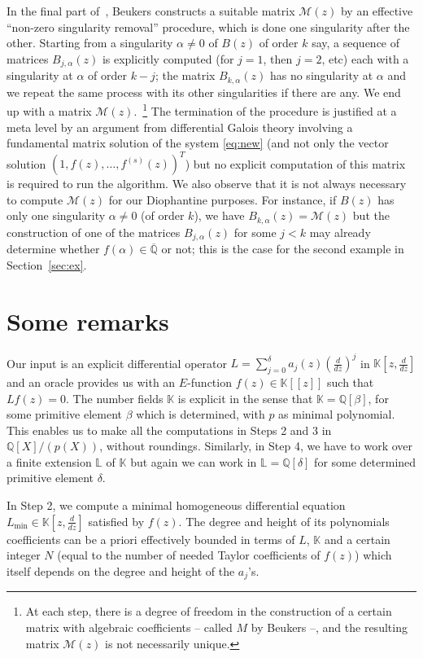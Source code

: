 \documentclass[reqno,english,12pt,a4paper]{smfart}
\numberwithin{equation}{section}
\def\Qbar{\overline{\mathbb Q}}
\def\K{\mathbb K}
\begin{document}
In the final part of~\cite{beukers}, Beukers constructs a suitable matrix $\mathcal{M}(z)$ by an effective ``non-zero singularity removal'' procedure, which is done one singularity after the other. Starting from a singularity $\alpha\neq 0$ of $B(z)$ of order $k$ say, 
a sequence of matrices $B_{j,\alpha}(z)$ is  explicitly computed (for $j=1$, then $j=2$, etc) each with a singularity at $\alpha$ of order $k-j$; the matrix $B_{k,\alpha}(z)$ has no singularity at $\alpha$ and we repeat the same process with its other singularities if there are any. We end up with a matrix $\mathcal{M}(z)$.~\footnote{At each step, there is a degree of freedom in the construction of a certain matrix with algebraic coefficients -- called $M$ by Beukers --, and the resulting matrix $\mathcal{M}(z)$ is not necessarily unique.} The termination of the procedure is justified at a meta level by an argument from differential Galois theory involving a fundamental matrix solution of the system \eqref{eq:new} (and not only the vector solution $(1,f(z), \ldots, f^{(s)}(z))^T$) but no explicit computation of this matrix is required to run the algorithm. We also observe that it is not always necessary to compute $\mathcal{M}(z)$ for our Diophantine purposes. For instance, if  $B(z)$ has only one singularity $\alpha\neq 0$ (of order $k$), we have $B_{k,\alpha}(z)=\mathcal{M}(z)$ but the construction of one of the matrices $B_{j,\alpha}(z)$ for some $j<k$ may already determine whether $f(\alpha)\in \Qbar$ or not; this is the case for the second example in Section~\ref{sec:ex}.



\section{Some remarks}

Our input is an explicit differential operator $L=\sum_{j=0}^\delta a_j(z)(\frac{d}{dz})^j$ in $\K[z,\frac{d}{dz}]$ and an oracle provides us with an $E$-function $f(z)\in \mathbb K[[z]]$ such that $Lf(z)=0$.  The number fields $\K$ is explicit in the sense that $\K=\mathbb Q[\beta]$, for some primitive element $\beta$ which is determined, with $p$ as minimal polynomial. This enables us  to make all the computations in Steps 2 and 3 in $\mathbb Q[X]/(p(X))$, without roundings. Similarly, in Step 4, we have to work over a finite extension $\mathbb L$ of $\K$ but again we can work in $\mathbb L=\mathbb Q[\delta]$ for some determined primitive element $\delta$.

In Step 2, we compute a minimal homogeneous differential equation $L_{\min} \in \K[z,\frac{d}{dz}]$ satisfied by $f(z)$. The degree and height of its polynomials coefficients can be a priori effectively bounded in terms of $L$, $\K$ and a certain integer $N$ (equal to the number of needed Taylor coefficients of $f(z)$) which itself depends on the degree and height of the $a_j$'s.
\end{document}
